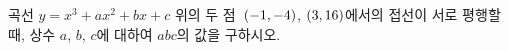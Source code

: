 곡선 $y=x^3+ax^2+bx+c$ 위의 두 점~$(-1{,}\mkern3mu\mathopen{}-4)$, $(3{,}\mkern3mu\mathopen{}16)$에서의 접선이 서로 평행할 때, 상수 $a$, $b$, $c$에 대하여 $abc$의 값을 구하시오.
